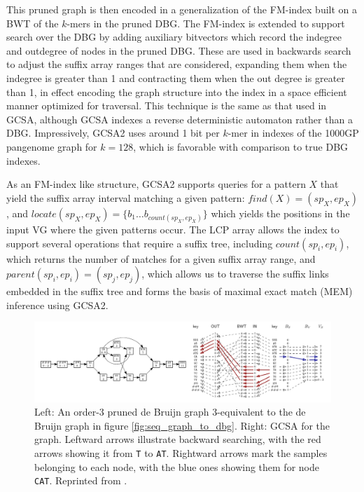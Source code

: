 This pruned graph is then encoded in a generalization of the FM-index built on a BWT of the $k$-mers in the pruned DBG.
The FM-index is extended to support search over the DBG by adding auxiliary bitvectors which record the indegree and outdegree of nodes in the pruned DBG.
These are used in backwards search to adjust the suffix array ranges that are considered, expanding them when the indegree is greater than 1 and contracting them when the out degree is greater than 1, in effect encoding the graph structure into the index in a space efficient manner optimized for traversal.
This technique is the same as that used in GCSA, although GCSA indexes a reverse deterministic automaton rather than a DBG.
Impressively, GCSA2 uses around 1 bit per $k$-mer in indexes of the 1000GP pangenome graph for $k=128$, which is favorable with comparison to true DBG indexes.

As an FM-index like structure, GCSA2 supports queries for a pattern $X$ that yield the suffix array interval matching a given pattern: $find(X) = ( sp_{X}, ep_{X} )$, and $locate( sp_{X}, ep_{X} ) = \{ b_1 \ldots b_{count(sp_{X}, ep_{X})} \}$ which yields the positions in the input VG where the given patterns occur.
The LCP array allows the index to support several operations that require a suffix tree, including $count(sp_i, ep_i)$, which returns the number of matches for a given suffix array range, and $parent(sp_i, ep_i) = (sp_j, ep_j)$, which allows us to traverse the suffix links embedded in the suffix tree and forms the basis of maximal exact match (MEM) inference using GCSA2.

\begin{figure}[htbp!]
  \includegraphics[width=\textwidth]{Chapter2/Figs/DBG_to_GCSA.pdf}
  \caption[Searching in the {\tt GCSA2}]{
    Left: An order-3 pruned de Bruijn graph 3-equivalent to the de Bruijn graph in figure \ref{fig:seq_graph_to_dbg}.
    Right: GCSA for the graph.
    Leftward arrows illustrate backward searching, with the red arrows showing it from {\tt T} to {\tt AT}.
    Rightward arrows mark the samples belonging to each node, with the blue ones showing them for node {\tt CAT}.
    Reprinted from \cite{siren2017indexing}.
  }
  \label{fig:gcsa2_search}
\end{figure}

